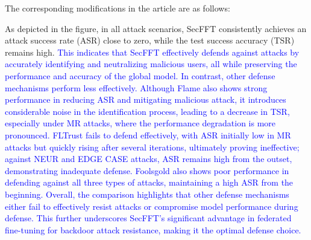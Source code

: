 \documentclass[a4paper,twoside,11pt,dvipsnames]{reviewresponse}
\begin{document}
The corresponding modifications in the article are as follows:

As depicted in the figure, in all attack scenarios, SecFFT consistently achieves an attack success rate (ASR) close to zero, while the test success accuracy (TSR) remains high. \textcolor{blue}{This indicates that SecFFT effectively defends against attacks by accurately identifying and neutralizing malicious users, all while preserving the performance and accuracy of the global model. In contrast, other defense mechanisms perform less effectively. Although Flame also shows strong performance in reducing ASR and mitigating malicious attack, it introduces considerable noise in the identification process, leading to a decrease in TSR, especially under MR attacks, where the performance degradation is more pronounced. FLTrust fails to defend effectively, with ASR initially low in MR attacks but quickly rising after several iterations, ultimately proving ineffective; against NEUR and EDGE CASE attacks, ASR remains high from the outset, demonstrating inadequate defense. Foolsgold also shows poor performance in defending against all three types of attacks, maintaining a high ASR from the beginning. Overall, the comparison highlights that other defense mechanisms either fail to effectively resist attacks or compromise model performance during defense. This further underscores SecFFT's significant advantage in federated fine-tuning for backdoor attack resistance, making it the optimal defense choice.}









\end{document}
